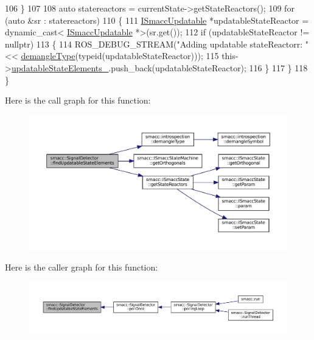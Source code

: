 \begin{DoxyCode}
106         \}
107 
108         \textcolor{keyword}{auto} statereactors = currentState->getStateReactors();
109         \textcolor{keywordflow}{for} (\textcolor{keyword}{auto} &sr : statereactors)
110         \{
111             \hyperlink{classISmaccUpdatable}{ISmaccUpdatable} *updatableStateReactor = \textcolor{keyword}{dynamic\_cast<}
      \hyperlink{classISmaccUpdatable}{ISmaccUpdatable} *\textcolor{keyword}{>}(sr.get());
112             \textcolor{keywordflow}{if} (updatableStateReactor != \textcolor{keyword}{nullptr})
113             \{
114                 ROS\_DEBUG\_STREAM(\textcolor{stringliteral}{"Adding updatable stateReactorr: "} << 
      \hyperlink{namespacesmacc_1_1introspection_a670e39ccea29952859df4e2d0e45077b}{demangleType}(\textcolor{keyword}{typeid}(updatableStateReactor)));
115                 this->\hyperlink{classsmacc_1_1SignalDetector_a07a5e7bb00c348435d954e22682fa610}{updatableStateElements\_}.push\_back(updatableStateReactor);
116             \}
117         \}
118     \}
\end{DoxyCode}
Here is the call graph for this function\+:
\nopagebreak
\begin{figure}[H]
\begin{center}
\leavevmode
\includegraphics[width=350pt]{classsmacc_1_1SignalDetector_a443234ebdf8cedd45cde725e64639dfe_cgraph}
\end{center}
\end{figure}
Here is the caller graph for this function\+:
\nopagebreak
\begin{figure}[H]
\begin{center}
\leavevmode
\includegraphics[width=350pt]{classsmacc_1_1SignalDetector_a443234ebdf8cedd45cde725e64639dfe_icgraph}
\end{center}
\end{figure}
\mbox{\label{classsmacc_1_1SignalDetector_a91ab3cd92d8095cdaf8610b50731f04b}} 
